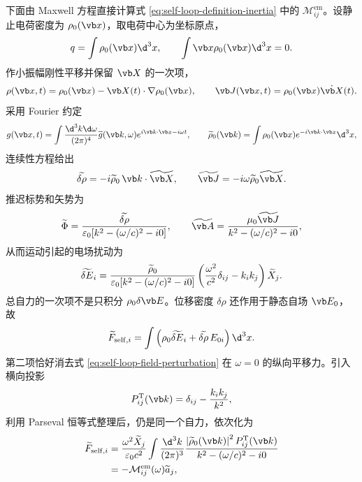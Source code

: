 下面由 Maxwell 方程直接计算式 \eqref{eq:self-loop-definition-inertia} 中的 $\mathcal M_{ij}^{\mathrm{em}}$。设静止电荷密度为 $\rho_0(\vb x)$，取电荷中心为坐标原点，
\begin{equation*}
 q=\int\rho_0(\vb x)\d^3x,
 \qquad
 \int\vb x\rho_0(\vb x)\d^3x=0.
\end{equation*}
作小振幅刚性平移并保留 $\vb X$ 的一次项，
\begin{equation}
 \rho(\vb x,t)
 =\rho_0(\vb x)-\vb X(t)\cdot\nabla\rho_0(\vb x),
 \qquad
 \vb J(\vb x,t)=\rho_0(\vb x)\dot{\vb X}(t).
 \label{eq:self-loop-rigid-current}
\end{equation}
采用 Fourier 约定
\begin{equation*}
 g(\vb x,t)=\int{\d^3k\d\omega\over(2\pi)^4}
 \widetilde g(\vb k,\omega)e^{i\vb k\cdot\vb x-i\omega t},
 \qquad
 \widetilde\rho_0(\vb k)=\int\rho_0(\vb x)e^{-i\vb k\cdot\vb x}\d^3x,
\end{equation*}
连续性方程给出
\begin{equation*}
 \widetilde{\delta\rho}
 =-i\widetilde\rho_0\,\vb k\cdot\widetilde{\vb X},
 \qquad
 \widetilde{\vb J}
 =-i\omega\widetilde\rho_0\widetilde{\vb X}.
\end{equation*}
推迟标势和矢势为
\begin{equation*}
 \widetilde\Phi
 ={\widetilde{\delta\rho}\over
 \varepsilon_0[k^2-(\omega/c)^2-i0]},
 \qquad
 \widetilde{\vb A}
 ={\mu_0\widetilde{\vb J}\over
 k^2-(\omega/c)^2-i0},
\end{equation*}
从而运动引起的电场扰动为
\begin{equation}
 \widetilde{\delta E}_i
 ={\widetilde\rho_0\over\varepsilon_0[k^2-(\omega/c)^2-i0]}
 \left({\omega^2\over c^2}\delta_{ij}-k_i k_j\right)
 \widetilde X_j.
 \label{eq:self-loop-field-perturbation}
\end{equation}
总自力的一次项不是只积分 $\rho_0\delta\vb E$。位移密度 $\delta\rho$ 还作用于静态自场 $\vb E_0$，故
\begin{equation*}
 \widetilde F_{\mathrm{self},i}
 =\int\left(\rho_0\widetilde{\delta E}_i
 +\widetilde{\delta\rho}\,E_{0i}\right)\d^3x.
\end{equation*}
第二项恰好消去式 \eqref{eq:self-loop-field-perturbation} 在 $\omega=0$ 的纵向平移力。引入横向投影
\begin{equation*}
 P_{ij}^{\mathrm T}(\vb k)=\delta_{ij}-{k_i k_j\over k^2},
\end{equation*}
利用 Parseval 恒等式整理后，仍是同一个自力，依次化为
\begin{align}
 \widetilde F_{\mathrm{self},i}
 &= {\omega^2\widetilde X_j\over\varepsilon_0c^2}
 \int{\d^3k\over(2\pi)^3}
 {\left|\widetilde\rho_0(\vb k)\right|^2P_{ij}^{\mathrm T}(\vb k)
 \over k^2-(\omega/c)^2-i0}
 \notag\\
 &=-\mathcal M_{ij}^{\mathrm{em}}(\omega)\widetilde a_j,
 \label{eq:self-loop-force-to-inertia}
\end{align}
